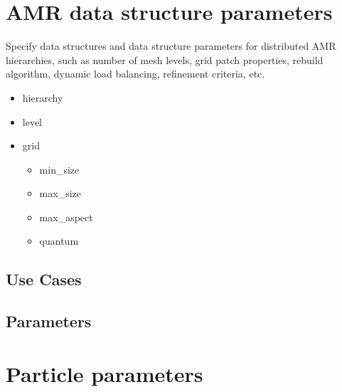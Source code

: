 \documentclass{book}
\begin{document}
\section{AMR data structure parameters} \label{s:amr}

Specify data structures and data structure parameters for distributed
AMR hierarchies, such as number of mesh levels, grid patch properties,
rebuild algorithm, dynamic load balancing, refinement criteria, etc.

\begin{itemize}
\item hierarchy
\item level
\item grid
\begin{itemize}
\item min\_size
\item max\_size
\item max\_aspect
\item quantum
\end{itemize}
\end{itemize}

\subsection{Use Cases}
\subsection{Parameters}

\section{Particle parameters} \label{s:data}
\end{document}
